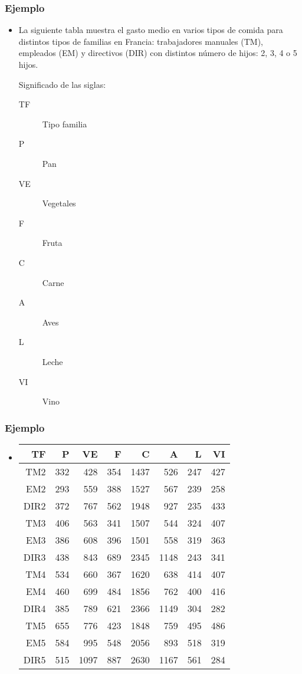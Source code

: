 \begin{frame}
\frametitle{Ejemplo}
\begin{itemize}
\item<2->{La siguiente tabla muestra el gasto medio en varios tipos de comida para distintos tipos de familias en Francia: trabajadores manuales (TM), empleados (EM) y directivos (DIR) con distintos número de hijos: 2, 3, 4 o 5 hijos.

Significado de las siglas:
\begin{description}
\item[TF] Tipo familia
\item[P] Pan
\item[VE] Vegetales
\item[F] Fruta
\item[C] Carne
\item[A] Aves
\item[L] Leche
\item[VI] Vino
\end{description}
}
\end{itemize}
\end{frame}
\begin{frame}
\frametitle{Ejemplo}
\begin{itemize}
\item<2->{\begin{tabular}{|r|r|r|r|r|r|r|r|}
\hline
TF&P&VE&F&C&A&L&VI\\\hline
TM2&332&428&354&1437&526&247&427\\\hline
EM2&293&559&388&1527&567&239&258\\\hline
DIR2&372&767&562&1948&927&235&433\\\hline
TM3&406&563&341&1507&544&324&407\\\hline
EM3&386&608&396&1501&558&319&363\\\hline
DIR3&438&843&689&2345&1148&243&341\\\hline
TM4&534&660&367&1620&638&414&407\\\hline
EM4&460&699&484&1856&762&400&416\\\hline
DIR4&385&789&621&2366&1149&304&282\\\hline
TM5&655&776&423&1848&759&495&486\\\hline
EM5&584&995&548&2056&893&518&319\\\hline
DIR5&515&1097&887&2630&1167&561&284\\\hline
\end{tabular}}
\end{itemize}
\end{frame}

